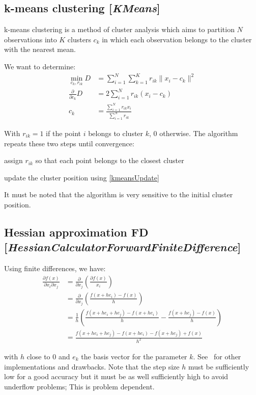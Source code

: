\documentclass[11pt]{article}
\newcommand{\nllref}[1]{[\small{\textit{#1}}]}
\newcommand{\norm}[1]{\| #1 \|}
\begin{document}
\subsection{k-means clustering \nllref{KMeans}}
k-means clustering is a method of cluster analysis which aims to partition $N$ observations into $K$ clusters $c_k$ in which each observation belongs to the cluster with the nearest mean.

We want to determine:
\begin{align}
\min_{c_k,r_{ik}} D &= \sum_{i=1}^N\sum_{k=1}^K r_{ik} \norm{x_i-c_k}^2\nonumber\\
\frac{\partial}{\partial c_k}D &= 2 \sum_{i=1}^Nr_{ik}(x_i-c_k) \nonumber\\
c_k &= \frac{\sum_{i=1}^N r_{ik}x_i}{\sum_{i=1}^N r_{ik}} \label{kmeansUpdate}
\end{align}

With $r_{ik}=1$ if the point $i$ belongs to cluster $k$, 0 otherwise. The algorithm repeats these two steps until convergence:
\begin{compactitem}
\item assign $r_{ik}$ so that each point belongs to the closest cluster
\item update the cluster position using \ref{kmeansUpdate}
\end{compactitem}
It must be noted that the algorithm is very sensitive to the initial cluster position.
\subsection{Hessian approximation FD \nllref{HessianCalculatorForwardFiniteDifference}}
Using finite differences, we have:
\begin{align}
\frac{\partial f(x)}{\partial x_i \partial x_j} &= \frac{\partial}{\partial x_j}( \frac{\partial f(x)}{x_i}) \nonumber\\
&= \frac{\partial}{\partial x_j}( \frac{f(x + he_i) - f(x)}{h} ) \nonumber\\
&= \frac{1}{h}( \frac{f(x + he_i + he_j) - f(x + he_i)}{h} - \frac{f(x + he_j) - f(x)}{h} ) \nonumber\\
&= \frac{f(x + he_i + he_j) - f(x + he_i)-f(x + he_j)+f(x)}{h^2}
\end{align}

with $h$ close to 0 and $e_k$ the basis vector for the parameter $k$. See~\cite{Scolnik01} for other implementations and drawbacks. Note that the step size $h$ must be sufficiently low for a good accuracy but it must be as well sufficiently high to avoid underflow problems; This is problem dependent.
\end{document}
